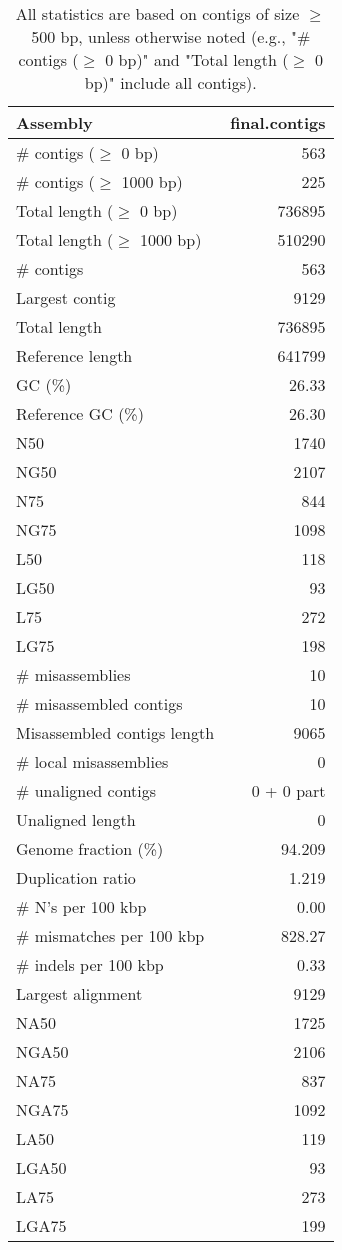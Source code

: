 \documentclass[12pt,a4paper]{article}
\begin{document}
\begin{table}[ht]
\begin{center}
\caption{All statistics are based on contigs of size $\geq$ 500 bp, unless otherwise noted (e.g., "\# contigs ($\geq$ 0 bp)" and "Total length ($\geq$ 0 bp)" include all contigs).}
\begin{tabular}{|l*{1}{|r}|}
\hline
Assembly & final.contigs \\ \hline
\# contigs ($\geq$ 0 bp) & 563 \\ \hline
\# contigs ($\geq$ 1000 bp) & 225 \\ \hline
Total length ($\geq$ 0 bp) & 736895 \\ \hline
Total length ($\geq$ 1000 bp) & 510290 \\ \hline
\# contigs & 563 \\ \hline
Largest contig & 9129 \\ \hline
Total length & 736895 \\ \hline
Reference length & 641799 \\ \hline
GC (\%) & 26.33 \\ \hline
Reference GC (\%) & 26.30 \\ \hline
N50 & 1740 \\ \hline
NG50 & 2107 \\ \hline
N75 & 844 \\ \hline
NG75 & 1098 \\ \hline
L50 & 118 \\ \hline
LG50 & 93 \\ \hline
L75 & 272 \\ \hline
LG75 & 198 \\ \hline
\# misassemblies & 10 \\ \hline
\# misassembled contigs & 10 \\ \hline
Misassembled contigs length & 9065 \\ \hline
\# local misassemblies & 0 \\ \hline
\# unaligned contigs & 0 + 0 part \\ \hline
Unaligned length & 0 \\ \hline
Genome fraction (\%) & 94.209 \\ \hline
Duplication ratio & 1.219 \\ \hline
\# N's per 100 kbp & 0.00 \\ \hline
\# mismatches per 100 kbp & 828.27 \\ \hline
\# indels per 100 kbp & 0.33 \\ \hline
Largest alignment & 9129 \\ \hline
NA50 & 1725 \\ \hline
NGA50 & 2106 \\ \hline
NA75 & 837 \\ \hline
NGA75 & 1092 \\ \hline
LA50 & 119 \\ \hline
LGA50 & 93 \\ \hline
LA75 & 273 \\ \hline
LGA75 & 199 \\ \hline
\end{tabular}
\end{center}
\end{table}
\end{document}
